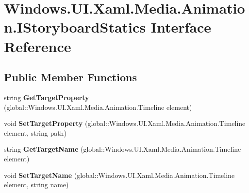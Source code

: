 \hypertarget{interface_windows_1_1_u_i_1_1_xaml_1_1_media_1_1_animation_1_1_i_storyboard_statics}{}\section{Windows.\+U\+I.\+Xaml.\+Media.\+Animation.\+I\+Storyboard\+Statics Interface Reference}
\label{interface_windows_1_1_u_i_1_1_xaml_1_1_media_1_1_animation_1_1_i_storyboard_statics}
\subsection*{Public Member Functions}
\begin{DoxyCompactItemize}
\item 
\mbox{\label{interface_windows_1_1_u_i_1_1_xaml_1_1_media_1_1_animation_1_1_i_storyboard_statics_a62e7f08dda4730dc9bec8462837a7476}} 
string {\bfseries Get\+Target\+Property} (global\+::\+Windows.\+U\+I.\+Xaml.\+Media.\+Animation.\+Timeline element)
\item 
\mbox{\label{interface_windows_1_1_u_i_1_1_xaml_1_1_media_1_1_animation_1_1_i_storyboard_statics_ae3787739563318b3f3282dfec151be5c}} 
void {\bfseries Set\+Target\+Property} (global\+::\+Windows.\+U\+I.\+Xaml.\+Media.\+Animation.\+Timeline element, string path)
\item 
\mbox{\label{interface_windows_1_1_u_i_1_1_xaml_1_1_media_1_1_animation_1_1_i_storyboard_statics_afeb68a7d3fc61bb8fdbba68aab2f0d4f}} 
string {\bfseries Get\+Target\+Name} (global\+::\+Windows.\+U\+I.\+Xaml.\+Media.\+Animation.\+Timeline element)
\item 
\mbox{\label{interface_windows_1_1_u_i_1_1_xaml_1_1_media_1_1_animation_1_1_i_storyboard_statics_ad1745f5d472fa822ee6f34d92a55ae55}} 
void {\bfseries Set\+Target\+Name} (global\+::\+Windows.\+U\+I.\+Xaml.\+Media.\+Animation.\+Timeline element, string name)
\item 

\end{DoxyCompactItemize}
